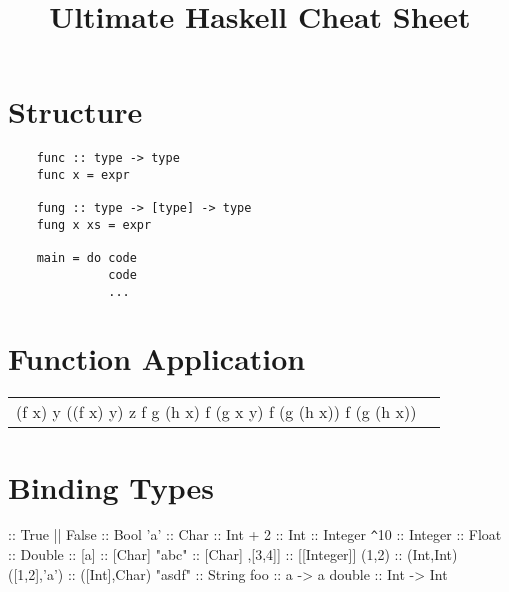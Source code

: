 \documentclass{refcard}
\title{Ultimate Haskell Cheat Sheet}
\begin{document}
\maketitle

\section{Structure}

\begin{verbatim}
	func :: type -> type
	func x = expr

	fung :: type -> [type] -> type
	fung x xs = expr

	main = do code
	          code
	          ...
\end{verbatim}


\section{Function Application}

\begin{tabular}{CC}
	\li[f x y] (f x) y
	\li[f x y z] ((f x) y) z
	\li[f g \$ h x] f g (h x)
	\li[f \$ g x y] f (g x y)
	\li[f \$ g \$ h x] f (g (h x))
	\li[(f . g . h) x] f (g (h x))
\end{tabular}


\section{Binding Types}

\begin{ldesc}
	               \s::\s{}
	\li[boolean]                True || False :: Bool
	\li[character]              'a' :: Char
	 :: Int
	 + 2 :: Int
	 :: Integer
	\verb+^+10 :: Integer
	 :: Float 
	 :: Double
	\li[list]                   [] :: [a]
	\li[]                       ['a','b','c'] :: [Char]
	\li                         "abc" :: [Char]
	\li[]                       [[1,2],[3,4]] :: [[Integer]]
	\li[tuple]                  (1,2) :: (Int,Int)
	\li                         ([1,2],'a') :: ([Int],Char)
	\li[string]                 "asdf" :: String
	\li[functions]              foo :: a -> a
	\li                         double :: Int -> Int
\end{ldesc}
\end{document}
